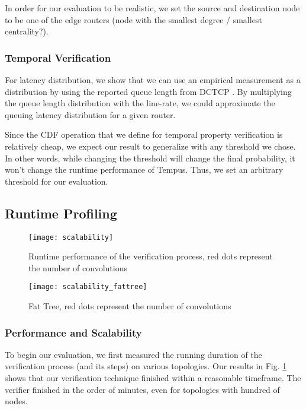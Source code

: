 In order for our evaluation to be realistic, we set the source and destination node to be one of the 
edge routers (node with the smallest degree / smallest centrality?).

\subsubsection{Temporal Verification}
For latency distribution, we show that we can use an empirical measurement as a distribution by 
using the reported queue length from DCTCP \cite{dctcp}.
By multiplying the queue length distribution with the line-rate, we could approximate the queuing 
latency distribution for a given router. 

Since the CDF operation that we define for temporal property verification is relatively cheap, 
we expect our result to generalize with any threshold we chose. 
In other words, while changing the threshold will change the final probability, it won't change 
the runtime performance of Tempus.
Thus, we set an arbitrary threshold for our evaluation.

\subsection{Runtime Profiling}

\begin{figure}[h]
    \centering
    \texttt{[image: scalability]}
    \caption{Runtime performance of the verification process, red dots represent the number of convolutions}
    \label{fig:scalability}
\end{figure}

\begin{figure}[h]
    \centering
    \texttt{[image: scalability\_fattree]}
    \caption{Fat Tree, red dots represent the number of convolutions}
    \label{fig:scalabilityfat}
\end{figure}

\subsubsection{Performance and Scalability}
To begin our evaluation, we first measured the running duration of the verification process (and its steps) 
on various topologies.
Our results in Fig. \ref{fig:scalability} shows that our verification technique finished within a reasonable timeframe.
The verifier finished in the order of minutes, even for topologies with hundred of nodes.

